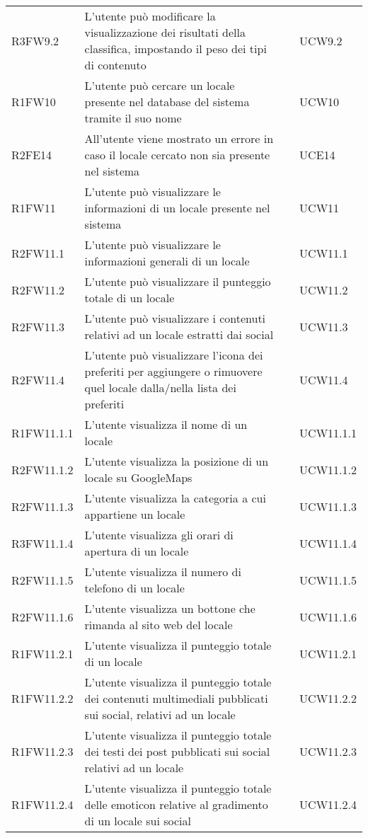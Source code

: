 \begin{longtable}{ m{}<{\centering}  m{}<{\centering}  m{}<{\centering}  m{}<{\centering}}
	R3FW9.2 & L’utente può modificare la visualizzazione dei risultati della classifica, impostando il peso dei tipi di contenuto & \Fa & UCW9.2\\	  
	 
	R1FW10 & L’utente può cercare un locale presente nel database del sistema tramite il suo nome & \Ob & UCW10 \\	 
	 
	R2FE14 & All’utente viene mostrato un errore in caso il locale cercato non sia presente nel sistema & \De & UCE14\\	 
	 	 
	R1FW11 & L’utente può visualizzare le informazioni di un locale presente nel sistema & \Ob & UCW11\\	

	R2FW11.1 & L’utente può visualizzare le informazioni generali di un locale & \De & UCW11.1 \\
	R2FW11.2 & L’utente può visualizzare il punteggio totale di un locale & \De & UCW11.2 \\
	R2FW11.3 & L’utente può visualizzare i contenuti relativi ad un locale estratti dai social & \De & UCW11.3 \\
	R2FW11.4 & L’utente può visualizzare l’icona dei preferiti per aggiungere o rimuovere quel locale dalla/nella lista dei preferiti & \De & UCW11.4 \\

	R1FW11.1.1 & L’utente visualizza il nome di un locale & \Ob & UCW11.1.1 \\
	R2FW11.1.2 & L’utente visualizza la posizione di un locale su GoogleMaps & \De & UCW11.1.2 \\
	R2FW11.1.3 & L’utente visualizza la categoria a cui appartiene un locale & \De & UCW11.1.3 \\
	R3FW11.1.4 & L’utente visualizza gli orari di apertura di un locale & \Fa & UCW11.1.4 \\
	R2FW11.1.5 & L’utente visualizza il numero di telefono di un locale & \De & UCW11.1.5 \\
	R2FW11.1.6 & L’utente visualizza un bottone che rimanda al sito web del locale & \De & UCW11.1.6 \\

	R1FW11.2.1 & L’utente visualizza il punteggio totale di un locale & \Ob & UCW11.2.1 \\
	R1FW11.2.2 & L’utente visualizza il punteggio totale dei contenuti multimediali pubblicati sui social, relativi ad un locale & \Ob & UCW11.2.2 \\
	R1FW11.2.3 & L’utente visualizza il punteggio totale dei testi dei post pubblicati sui social relativi ad un locale & \Ob & UCW11.2.3 \\
	R1FW11.2.4 & L’utente visualizza il punteggio totale delle emoticon relative al gradimento di un locale sui social & \Ob & UCW11.2.4 \\


\end{longtable}
